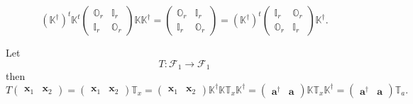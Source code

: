 \documentclass[aps, preprint]{revtex4}
\begin{document}
\begin{equation}\left (\mathbb{K}^{ \dag }\right )^{t} \mathbb{K}^{t} \left (\begin{array}{cc}\mathbb{O}_{r} & \mathbb{I}_{r} \\
\mathbb{I}_{r} & \mathbb{O}_{r}\end{array}\right ) \mathbb{K} \mathbb{K}^{ \dag } =\left (\begin{array}{cc}\mathbb{O}_{r} & \mathbb{I}_{r} \\
\mathbb{I}_{r} & \mathbb{O}_{r}\end{array}\right ) =\left (\mathbb{K}^{ \dag }\right )^{t} \left (\begin{array}{cc}\mathbb{I}_{r} & \mathbb{O}_{r} \\
\mathbb{O}_{r} & \mathbb{I}_{r}\end{array}\right ) \mathbb{K}^{ \dag }\text{.}
\end{equation}

Let
\begin{equation}T :\mathcal{F}_{1} \rightarrow \mathcal{F}_{1}
\end{equation}then
\begin{equation}T \left (\begin{array}{cc}\mathbf{x}_{1} & \mathbf{x}_{2}\end{array}\right ) =\left (\begin{array}{cc}\mathbf{x}_{1} & \mathbf{x}_{2}\end{array}\right ) \mathbb{T}_{x} =\left (\begin{array}{cc}\mathbf{x}_{1} & \mathbf{x}_{2}\end{array}\right ) \mathbb{K}^{ \dag } \mathbb{K} \mathbb{T}_{x} \mathbb{K}^{ \dag } =\left (\begin{array}{cc}\mathbf{a}^{ \dag } & \mathbf{a}\end{array}\right ) \mathbb{K} \mathbb{T}_{x} \mathbb{K}^{ \dag } =\left (\begin{array}{cc}\mathbf{a}^{ \dag } & \mathbf{a}\end{array}\right ) \mathbb{T}_{a}\text{.}
\end{equation}
\end{document}
